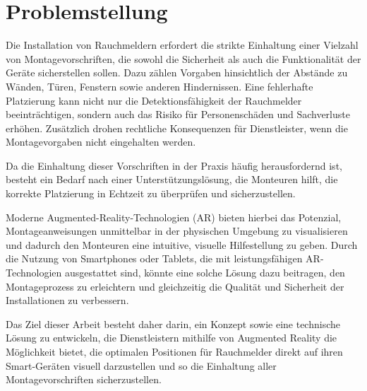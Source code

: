 \section{Problemstellung}
\label{sec:problem}

Die Installation von Rauchmeldern erfordert die strikte Einhaltung einer Vielzahl von Montagevorschriften, die sowohl die Sicherheit als auch die Funktionalit\"at der Ger\"ate sicherstellen sollen. Dazu z\"ahlen Vorgaben hinsichtlich der Abst\"ande zu W\"anden, T\"uren, Fenstern sowie anderen Hindernissen. Eine fehlerhafte Platzierung kann nicht nur die Detektionsf\"ahigkeit der Rauchmelder beeintr\"achtigen, sondern auch das Risiko f\"ur Personensch\"aden und Sachverluste erh\"ohen. Zus\"atzlich drohen rechtliche Konsequenzen f\"ur Dienstleister, wenn die Montagevorgaben nicht eingehalten werden.

Da die Einhaltung dieser Vorschriften in der Praxis h\"aufig herausfordernd ist, besteht ein Bedarf nach einer Unterst\"utzungsl\"osung, die Monteuren hilft, die korrekte Platzierung in Echtzeit zu \"uberpr\"ufen und sicherzustellen.

Moderne Augmented-Reality-Technologien (AR) bieten hierbei das Potenzial, Montageanweisungen unmittelbar in der physischen Umgebung zu visualisieren und dadurch den Monteuren eine intuitive, visuelle Hilfestellung zu geben. Durch die Nutzung von Smartphones oder Tablets, die mit leistungsf\"ahigen AR-Technologien ausgestattet sind, k\"onnte eine solche L\"osung dazu beitragen, den Montageprozess zu erleichtern und gleichzeitig die Qualit\"at und Sicherheit der Installationen zu verbessern.

Das Ziel dieser Arbeit besteht daher darin, ein Konzept sowie eine technische L\"osung zu entwickeln, die Dienstleistern mithilfe von Augmented Reality die M\"oglichkeit bietet, die optimalen Positionen f\"ur Rauchmelder direkt auf ihren Smart-Ger\"aten visuell darzustellen und so die Einhaltung aller Montagevorschriften sicherzustellen.